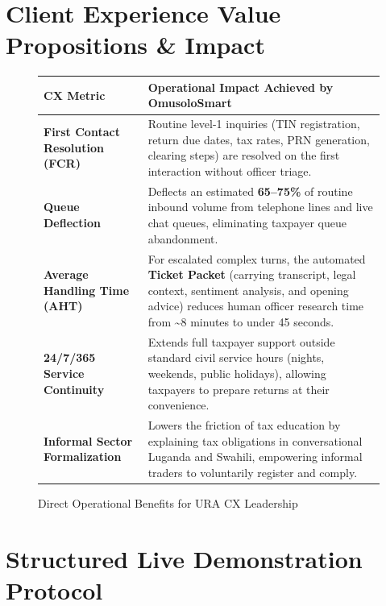 \documentclass[10pt,a4paper]{article}
\begin{document}
\section{Client Experience Value Propositions \& Impact}

\begin{figure}[h!]
\centering
\small
\begin{tabularx}{\textwidth}{l X}
\toprule
\textbf{CX Metric} & \textbf{Operational Impact Achieved by OmusoloSmart} \\
\midrule
\textbf{First Contact Resolution (FCR)} & Routine level-1 inquiries (TIN registration, return due dates, tax rates, PRN generation, clearing steps) are resolved on the first interaction without officer triage. \\
\addlinespace
\textbf{Queue Deflection} & Deflects an estimated \textbf{65--75\%} of routine inbound volume from telephone lines and live chat queues, eliminating taxpayer queue abandonment. \\
\addlinespace
\textbf{Average Handling Time (AHT)} & For escalated complex turns, the automated \textbf{Ticket Packet} (carrying transcript, legal context, sentiment analysis, and opening advice) reduces human officer research time from \textasciitilde{}8 minutes to under 45 seconds. \\
\addlinespace
\textbf{24/7/365 Service Continuity} & Extends full taxpayer support outside standard civil service hours (nights, weekends, public holidays), allowing taxpayers to prepare returns at their convenience. \\
\addlinespace
\textbf{Informal Sector Formalization} & Lowers the friction of tax education by explaining tax obligations in conversational Luganda and Swahili, empowering informal traders to voluntarily register and comply. \\
\bottomrule
\end{tabularx}
\caption{Direct Operational Benefits for URA CX Leadership}
\end{figure}

\section{Structured Live Demonstration Protocol}
\end{document}
